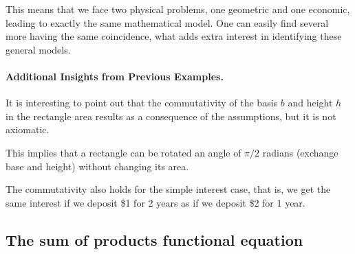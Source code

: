 This means that we face two physical problems, one geometric and one economic, leading to exactly the same mathematical model. One can easily find several more having the same coincidence, what adds extra interest in identifying these general models.


\paragraph{Additional Insights from Previous Examples.}
It is interesting to point out that the commutativity of the basis $b$ and height $h$ in the rectangle area results as a consequence of the assumptions, but it is not axiomatic.

This implies that a rectangle can be rotated an angle of $\pi/2$ radians (exchange base and height) without changing its area.

The commutativity also holds for the simple interest case, that is, we get the same interest if we deposit \$1 for 2 years as if we deposit \$2 for 1 year.


\subsection{The sum of products functional equation}
